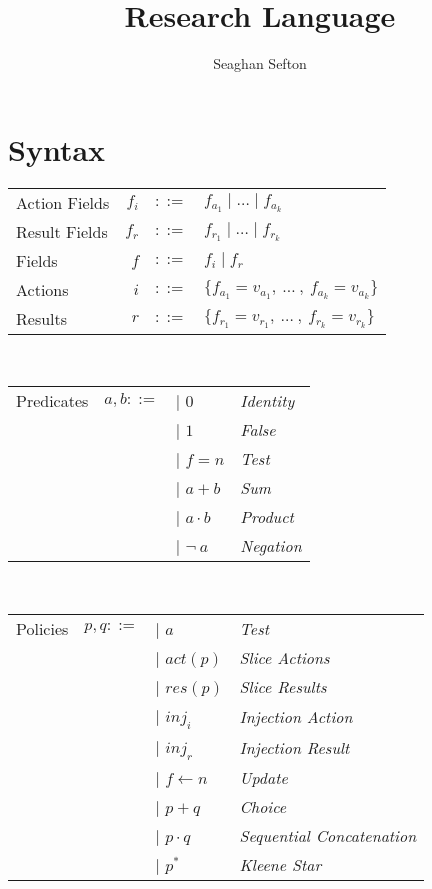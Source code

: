 \documentclass[12pt, letterpaper]{article}
\title{Research Language}
\author{Seaghan Sefton}
\begin{document}
\section*{Syntax}


	\begin{tabular}{l r c l}
		Action Fields	& $f_{i}$ 	& $::=$		& $f_{a_{1}} \mid \dots \mid f_{a_{k}}$\\
		Result Fields 	& $f_{r}$ 	& $::=$		& $f_{r_{1}} \mid \dots \mid f_{r_{k}}$\\
		Fields 	        & $f$ 	        & $::=$         & $f_i \mid f_r$ \\
		Actions			& $i$ 	& $::=$ 	& $\{f_{a_{1}} = v_{a_{1}} ,\ \dots\ ,\ f_{a_{k}} = v_{a_{k}}\}$\\
		Results			& $r$ 	& $::=$ 	& $\{f_{r_{1}} = v_{r_{1}} ,\ \dots\ ,\ f_{r_{k}} = v_{r_{k}}\}$\\
	\end{tabular}\\
	\begin{tabular}{l c l l}
		Predicates 	& $a,b ::=$ & $\mid$ $0$ 			& \textit{Identity}	\\
					& 			& $\mid$ $1$ 			& \textit{False}	\\
					&			& $\mid$ $f=n$			& \textit{Test}	\\	
					& 			& $\mid$ $a + b$ 		& \textit{Sum}		\\
					& 			& $\mid$ $a \cdot b$ 	& \textit{Product}	\\
					&			& $\mid$ $\neg \ a$		& \textit{Negation}
	\end{tabular}\\
	\begin{tabular}{l c l l}
		Policies 	& $p,q ::=$ & $\mid$ $a$ 				& \textit{Test}		\\
					& 			& $\mid$ $act(p)$ 			& \textit{Slice Actions}	\\
					& 			& $\mid$ $res(p)$ 			& \textit{Slice Results}	\\
					& 			& $\mid$ $inj_{i}$ 			& \textit{Injection Action}	\\
					& 			& $\mid$ $inj_{r}$ 			& \textit{Injection Result}	\\
					&			& $\mid$ $f \leftarrow n$		& \textit{Update}	\\
					&			& $\mid$ $p + q$			& \textit{Choice}	\\
					&			& $\mid$ $p \cdot q$		& \textit{Sequential Concatenation}	\\
					&			& $\mid$ $p ^{*}$			& \textit{Kleene Star}
	\end{tabular}\\
\end{document}
